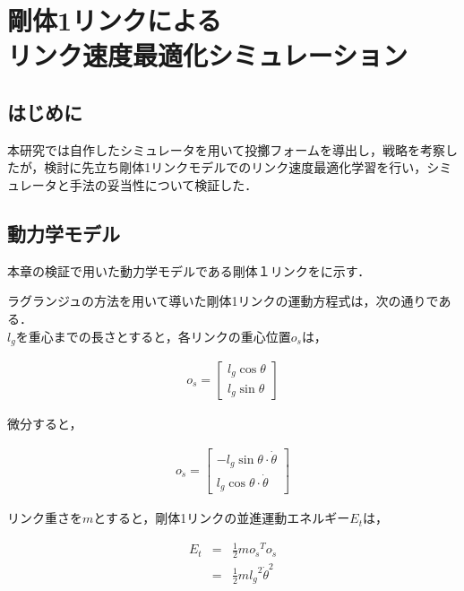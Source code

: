\chapter[剛体1リンクによるリンク速度最適化シミュレーション]{剛体1リンクによる\\リンク速度最適化シミュレーション}

\section{はじめに}
本研究では自作したシミュレータを用いて投擲フォームを導出し，戦略を考察したが，検討に先立ち剛体1リンクモデルでのリンク速度最適化学習を行い，シミュレータと手法の妥当性について検証した．
\section{動力学モデル}
本章の検証で用いた動力学モデルである剛体１リンクをに示す．\\


ラグランジュの方法\cite{lagrange}を用いて導いた剛体1リンクの運動方程式は，次の通りである．\\
$l_{g}$を重心までの長さとすると，各リンクの重心位置$o_{s}$は，

\begin{eqnarray}
  o_{s} = 
              \begin{bmatrix}
              l_{g}\cos\theta\\
              l_{g}\sin\theta
              \end{bmatrix}
\end{eqnarray}

微分すると，

\begin{eqnarray}
  o_{\dot{s}} = 
              \begin{bmatrix}
              -l_{g}\sin\theta \cdot \dot{\theta}\\
              l_{g}\cos\theta \cdot \dot{\theta}
              \end{bmatrix}
\end{eqnarray}

リンク重さを$m$とすると，剛体1リンクの並進運動エネルギー$E_{t}$は，

\begin{eqnarray}
  E_{t} 
  &=&\frac{1}{2}mo_{\dot{s}}{}^T\!o_{\dot{s}} \nonumber \\
  &=&\frac{1}{2}m{l_{g}}^2{\dot{\theta}}^2
\end{eqnarray}


